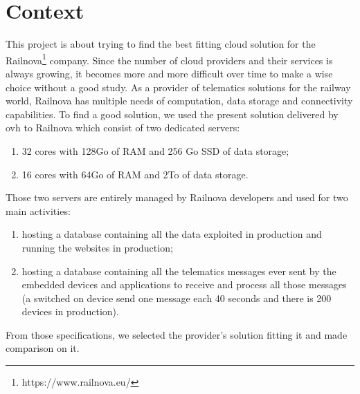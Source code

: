 \documentclass[a4paper,11pt]{article}
\begin{document}
\section{Context}
This project is about trying to find the best fitting cloud solution for the Railnova\footnote{https://www.railnova.eu/} company. Since the number of cloud providers and their services is always growing, it becomes more and more difficult over time to make a wise choice without a good study. As a provider of telematics solutions for the railway world, Railnova has multiple needs of computation, data storage and connectivity capabilities. To find a good solution, we used the present solution delivered by ovh to Railnova which consist of two dedicated servers:
\begin{enumerate}
  \item 32 cores with 128Go of RAM and 256 Go SSD of data storage;
  \item 16 cores with 64Go of RAM and 2To of data storage.
\end{enumerate}
Those two servers are entirely managed by Railnova developers and used for two main activities:
\begin{enumerate}
  \item hosting a database containing all the data exploited in production and running the websites in production;
  \item hosting a database containing all the telematics messages ever sent by the embedded devices and applications to receive and process all those messages (a switched on device send one message each 40 seconds and there is 200 devices in production).
\end{enumerate}
From those specifications, we selected the provider's solution fitting it and made comparison on it.\\
\end{document}
